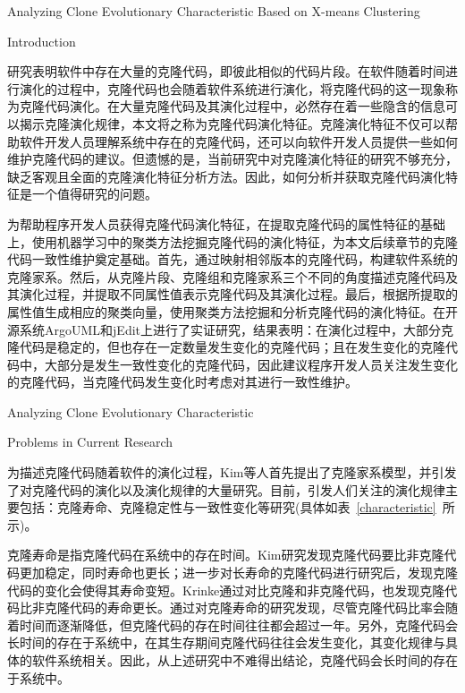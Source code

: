 
{Analyzing Clone Evolutionary Characteristic Based on X-means Clustering}

{Introduction}

研究表明软件中存在大量的克隆代码，即彼此相似的代码片段。在软件随着时间进行演化的过程中，克隆代码也会随着软件系统进行演化，将克隆代码的这一现象称为克隆代码演化。在大量克隆代码及其演化过程中，必然存在着一些隐含的信息可以揭示克隆演化规律，本文将之称为克隆代码演化特征。克隆演化特征不仅可以帮助软件开发人员理解系统中存在的克隆代码，还可以向软件开发人员提供一些如何维护克隆代码的建议。但遗憾的是，当前研究中对克隆演化特征的研究不够充分，缺乏客观且全面的克隆演化特征分析方法。因此，如何分析并获取克隆代码演化特征是一个值得研究的问题。

为帮助程序开发人员获得克隆代码演化特征，在提取克隆代码的属性特征的基础上，使用机器学习中的聚类方法挖掘克隆代码的演化特征，为本文后续章节的克隆代码一致性维护奠定基础。首先，通过映射相邻版本的克隆代码，构建软件系统的克隆家系。然后，从克隆片段、克隆组和克隆家系三个不同的角度描述克隆代码及其演化过程，并提取不同属性值表示克隆代码及其演化过程。最后，根据所提取的属性值生成相应的聚类向量，使用聚类方法挖掘和分析克隆代码的演化特征。在开源系统ArgoUML和jEdit上进行了实证研究，结果表明：在演化过程中，大部分克隆代码是稳定的，但也存在一定数量发生变化的克隆代码；且在发生变化的克隆代码中，大部分是发生一致性变化的克隆代码，因此建议程序开发人员关注发生变化的克隆代码，当克隆代码发生变化时考虑对其进行一致性维护。

{Analyzing Clone Evolutionary Characteristic}

{Problems in Current Research}

为描述克隆代码随着软件的演化过程，Kim等人首先提出了克隆家系模型\cite{kim2005empirical}，并引发了对克隆代码的演化以及演化规律的大量研究。目前，引发人们关注的演化规律主要包括：克隆寿命、克隆稳定性与一致性变化等研究(具体如表~\ref{characteristic}~所示)。

克隆寿命是指克隆代码在系统中的存在时间。Kim研究发现克隆代码要比非克隆代码更加稳定，同时寿命也更长\cite{kim2005empirical}；进一步对长寿命的克隆代码进行研究后，发现克隆代码的变化会使得其寿命变短\cite{cai2011empirical}。Krinke通过对比克隆和非克隆代码，也发现克隆代码比非克隆代码的寿命更长\cite{krinke2011cloned}。通过对克隆寿命的研究发现，尽管克隆代码比率会随着时间而逐渐降低，但克隆代码的存在时间往往都会超过一年\cite{bazrafshan2012evolution}。另外，克隆代码会长时间的存在于系统中，在其生存期间克隆代码往往会发生变化，其变化规律与具体的软件系统相关\cite{gode2009evolution}。因此，从上述研究中不难得出结论，克隆代码会长时间的存在于系统中。

